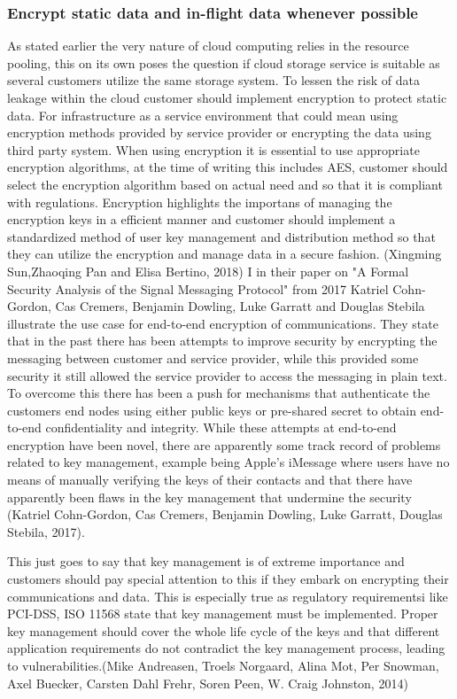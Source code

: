 \documentclass{article}
\begin{document}
\subsubsection{Encrypt static data and in-flight data whenever possible}
As stated earlier the very nature of cloud computing relies in the resource pooling, this on its own poses the question if cloud storage service is suitable as several customers utilize the same storage system. To lessen the risk of data leakage within the cloud customer should implement encryption to protect static data. For infrastructure as a service environment that could mean using encryption methods provided by service provider or encrypting the data using third party system. When using encryption it is essential to use appropriate encryption algorithms, at the time of writing this includes AES, customer should select the encryption algorithm based on actual need and so that it is compliant with regulations. Encryption highlights the importans of managing the encryption keys in a efficient manner and customer should implement a standardized method of user key management and distribution method so that they can utilize the encryption and manage data in a secure fashion. (Xingming Sun,Zhaoqing Pan and Elisa Bertino, 2018)
I in their paper on "A Formal Security Analysis of the Signal Messaging Protocol" from 2017 Katriel Cohn-Gordon, Cas Cremers, Benjamin Dowling, Luke Garratt and Douglas Stebila illustrate the use case for end-to-end encryption of communications.
They state that in the past there has been attempts to improve security by encrypting the messaging between customer and service provider, while this provided some security it still allowed the service provider to access the messaging in plain text.
To overcome this there has been a push for mechanisms that authenticate the customers end nodes using either public keys or pre-shared secret to obtain end-to-end confidentiality and integrity.
While these attempts at end-to-end encryption have been novel, there are apparently some track record of problems related to key management, example being Apple's iMessage where users have no means of manually verifying the keys of their contacts and that there have apparently been flaws in the key management that undermine the security (Katriel Cohn-Gordon, Cas Cremers, Benjamin Dowling, Luke Garratt, Douglas Stebila, 2017).
\par
This just goes to say that key management is of extreme importance and customers should pay special attention to this if they embark on encrypting their communications and data. This is especially true as regulatory requirementsi like PCI-DSS, ISO 11568 state that key management must be implemented. Proper key management should cover the whole life cycle of the keys and that different application requirements do not contradict the key management process, leading to vulnerabilities.(Mike Andreasen, Troels Norgaard, Alina Mot, Per Snowman, Axel Buecker, Carsten Dahl Frehr, Soren Peen, W. Craig Johnston, 2014) 
\end{document}
